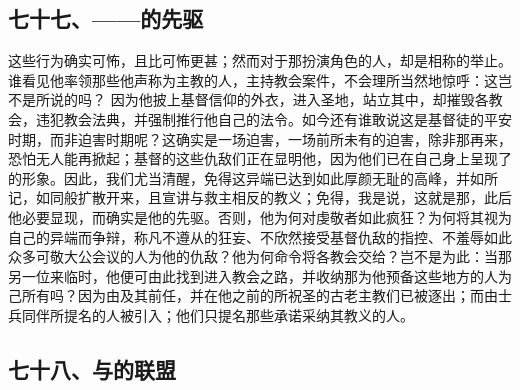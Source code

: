 
\subsection{七十七、——的先驱}

这些行为确实可怖，且比可怖更甚；然而对于那扮演角色的人，却是相称的举止。谁看见他率领那些他声称为主教的人，主持教会案件，不会理所当然地惊呼：这岂不是所说的吗？ 因为他披上基督信仰的外衣，进入圣地，站立其中，却摧毁各教会，违犯教会法典，并强制推行他自己的法令。如今还有谁敢说这是基督徒的平安时期，而非迫害时期呢？这确实是一场迫害，一场前所未有的迫害，除非那再来，恐怕无人能再掀起；基督的这些仇敌们正在显明他，因为他们已在自己身上呈现了的形象。因此，我们尤当清醒，免得这异端已达到如此厚颜无耻的高峰，并如所记，如同般扩散开来，且宣讲与救主相反的教义；免得，我是说，这就是那，此后他必要显现，而确实是他的先驱。否则，他为何对虔敬者如此疯狂？为何将其视为自己的异端而争辩，称凡不遵从的狂妄、不欣然接受基督仇敌的指控、不羞辱如此众多可敬大公会议的人为他的仇敌？他为何命令将各教会交给？岂不是为此：当那另一位来临时，他便可由此找到进入教会之路，并收纳那为他预备这些地方的人为己所有吗？因为由及其前任，并在他之前的所祝圣的古老主教们已被逐出；而由士兵同伴所提名的人被引入；他们只提名那些承诺采纳其教义的人。\par


\subsection{七十八、与的联盟}

